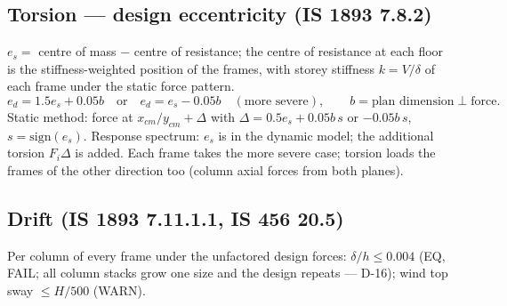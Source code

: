 \documentclass[10pt,a4paper]{article}
\begin{document}
\subsection{Torsion --- design eccentricity (IS 1893 7.8.2)}
$e_s=$ centre of mass $-$ centre of resistance; the centre of resistance at each floor is the stiffness-weighted
position of the frames, with storey stiffness $k=V/\delta$ of each frame under the static force pattern.
\[
e_d=1.5e_s+0.05b\quad\text{or}\quad e_d=e_s-0.05b\quad(\text{more severe}),\qquad b=\text{plan dimension}\perp\text{force}.
\]
Static method: force at $x_{cm}/y_{cm}+\Delta$ with $\Delta=0.5e_s+0.05b\,s$ or $-0.05b\,s$, $s=\mathrm{sign}(e_s)$.
Response spectrum: $e_s$ is in the dynamic model; the additional torsion $F_i\Delta$ is added. Each frame takes the
more severe case; torsion loads the frames of the other direction too (column axial forces from both planes).

\subsection{Drift (IS 1893 7.11.1.1, IS 456 20.5)}
Per column of every frame under the unfactored design forces: $\delta/h\le0.004$ (EQ, FAIL; all column stacks grow
one size and the design repeats --- D-16); wind top sway $\le H/500$ (WARN).
\end{document}
